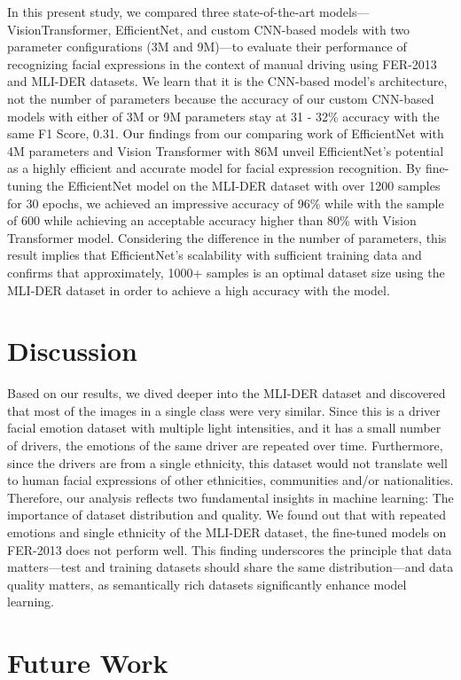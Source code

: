 \documentclass[sigconf]{acmart}
\begin{document}
In this present study, we compared three state-of-the-art models—VisionTransformer, EfficientNet, and custom CNN-based models with two parameter configurations (3M and 9M)—to evaluate their performance of recognizing facial expressions in the context of manual driving using FER-2013 and MLI-DER datasets. We learn that it is the CNN-based model's architecture, not the number of parameters because the accuracy of our custom CNN-based models with either of 3M or 9M parameters stay at 31 - 32\% accuracy with the same F1 Score, 0.31. Our findings from our comparing work of EfficientNet with 4M parameters and Vision Transformer with 86M unveil EfficientNet's potential as a highly efficient and accurate model for facial expression recognition. By fine-tuning the EfficientNet model on the MLI-DER dataset with over 1200 samples for 30 epochs, we achieved an impressive accuracy of 96\% while with the sample of 600 while achieving an acceptable accuracy higher than 80\% with Vision Transformer model. Considering the difference in the number of parameters, this result implies that EfficientNet's scalability with sufficient training data and confirms that approximately, 1000+ samples is an optimal dataset size using the MLI-DER dataset in order to achieve a high accuracy with the model.


\section{Discussion}
Based on our results, we dived deeper into the MLI-DER dataset and discovered that most of the images in a single class were very similar. Since this is a driver facial emotion dataset with multiple light intensities, and it has a small number of drivers, the emotions of the same driver are repeated over time. Furthermore, since the drivers are from a single ethnicity, this dataset would not translate well to human facial expressions of other ethnicities, communities and/or nationalities. Therefore, our analysis reflects two fundamental insights in machine learning: The importance of dataset distribution and quality. We found out that with repeated emotions and single ethnicity of the MLI-DER dataset, the fine-tuned models on FER-2013 does not perform well. This finding underscores the principle that data matters—test and training datasets should share the same distribution—and data quality matters, as semantically rich datasets significantly enhance model learning.

\section{Future Work}
\end{document}
